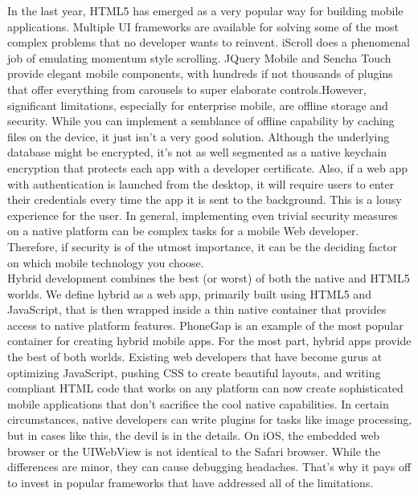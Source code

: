 In the last year, HTML5 has emerged as a very popular way for building mobile applications. Multiple UI frameworks are available for solving some of the most complex problems that no developer wants to reinvent. iScroll does a phenomenal job of emulating momentum style scrolling. JQuery Mobile and Sencha Touch provide elegant mobile components, with hundreds if not thousands of plugins that offer everything from carousels to super elaborate controls.However, significant limitations, especially for enterprise mobile, are offline storage and security. While you can implement a semblance of offline capability by caching files on the device, it just isn't a very good solution. Although the underlying database might be encrypted, it’s not as well segmented as a native keychain encryption that protects each app with a developer certificate. Also, if a web app with authentication is launched from the desktop, it will require users to enter their credentials every time the app it is sent to the background. This is a lousy experience for the user. In general, implementing even trivial security measures on a native platform can be complex tasks for a mobile Web developer. Therefore, if security is of the utmost importance, it can be the deciding factor on which mobile technology you choose.\\
Hybrid development combines the best (or worst) of both the native and HTML5 worlds. We define hybrid as a web app, primarily built using HTML5 and JavaScript, that is then wrapped inside a thin native container that provides access to native platform features. PhoneGap is an example of the most popular container for creating hybrid mobile apps.
For the most part, hybrid apps provide the best of both worlds. Existing web developers that have become gurus at optimizing JavaScript, pushing CSS to create beautiful layouts, and writing compliant HTML code that works on any platform can now create sophisticated mobile applications that don’t sacrifice the cool native capabilities. In certain circumstances, native developers can write plugins for tasks like image processing, but in cases like this, the devil is in the details.
On iOS, the embedded web browser or the UIWebView is not identical to the Safari browser. While the differences are minor, they can cause debugging headaches. That’s why it pays off to invest in popular frameworks that have addressed all of the limitations.
